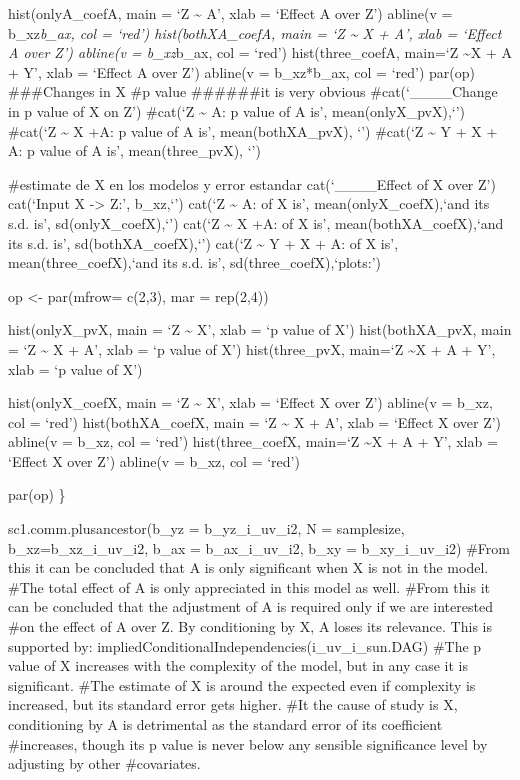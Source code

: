 \documentclass[
]{article}
\begin{document}
hist(onlyA\_coefA, main = `Z \textasciitilde{} A', xlab = `Effect A over
Z') abline(v = b\_xz\emph{b\_ax, col = `red') hist(bothXA\_coefA, main =
`Z \textasciitilde{} X + A', xlab = `Effect A over Z') abline(v =
b\_xz}b\_ax, col = `red') hist(three\_coefA, main=`Z \textasciitilde X +
A + Y', xlab = `Effect A over Z') abline(v = b\_xz*b\_ax, col = `red')
par(op) \#\#\#Changes in X \#p value \#\#\#\#\#\#it is very obvious
\#cat(`\n\_\_\_\_Change in p value of X on Z\n') \#cat(`\nWhen Z
\textasciitilde{} A: \nThe p value of A is', mean(onlyX\_pvX),`\n')
\#cat(`\nWhen Z \textasciitilde{} X +A: \nThe p value of A is',
mean(bothXA\_pvX), `\n') \#cat(`\nWhen Z \textasciitilde{} Y + X + A:
\nThe p value of A is', mean(three\_pvX), `\n')

\#estimate de X en los modelos y error estandar cat(`\n\_\_\_\_Effect of
X over Z\n\n') cat(`Input X -\textgreater{} Z:', b\_xz,`\n')
cat(`\nWhen Z \textasciitilde{} A: \nCoefficient of X is',
mean(onlyX\_coefX),`and its s.d. is', sd(onlyX\_coefX),`\n')
cat(`\nWhen Z \textasciitilde{} X +A: \nCoefficient of X is',
mean(bothXA\_coefX),`and its s.d. is', sd(bothXA\_coefX),`\n')
cat(`\nWhen Z \textasciitilde{} Y + X + A: \nCoefficient of X is',
mean(three\_coefX),`and its s.d. is', sd(three\_coefX),`\nSee plots:\n')

op \textless- par(mfrow= c(2,3), mar = rep(2,4))

hist(onlyX\_pvX, main = `Z \textasciitilde{} X', xlab = `p value of X')
hist(bothXA\_pvX, main = `Z \textasciitilde{} X + A', xlab = `p value of
X') hist(three\_pvX, main=`Z \textasciitilde X + A + Y', xlab = `p value
of X')

hist(onlyX\_coefX, main = `Z \textasciitilde{} X', xlab = `Effect X over
Z') abline(v = b\_xz, col = `red') hist(bothXA\_coefX, main = `Z
\textasciitilde{} X + A', xlab = `Effect X over Z') abline(v = b\_xz,
col = `red') hist(three\_coefX, main=`Z \textasciitilde X + A + Y', xlab
= `Effect X over Z') abline(v = b\_xz, col = `red')

par(op) \}

sc1.comm.plusancestor(b\_yz = b\_yz\_i\_uv\_i2, N = samplesize,
b\_xz=b\_xz\_i\_uv\_i2, b\_ax = b\_ax\_i\_uv\_i2, b\_xy =
b\_xy\_i\_uv\_i2) \#From this it can be concluded that A is only
significant when X is not in the model. \#The total effect of A is only
appreciated in this model as well. \#From this it can be concluded that
the adjustment of A is required only if we are interested \#on the
effect of A over Z. By conditioning by X, A loses its relevance. This is
supported by: impliedConditionalIndependencies(i\_uv\_i\_sun.DAG) \#The
p value of X increases with the complexity of the model, but in any case
it is significant. \#The estimate of X is around the expected even if
complexity is increased, but its standard error gets higher. \#It the
cause of study is X, conditioning by A is detrimental as the standard
error of its coefficient \#increases, though its p value is never below
any sensible significance level by adjusting by other \#covariates.
\end{document}
